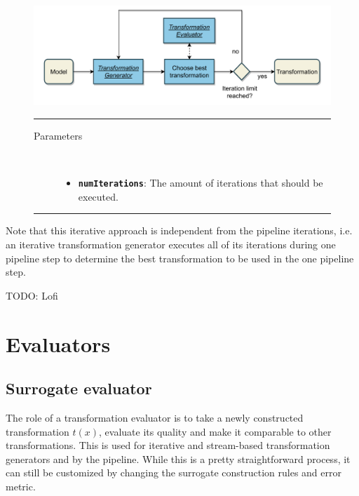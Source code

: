 \documentclass[
  a4paper,  %
  twoside,  %
  bibliography=totoc,
  headsepline,
  cleardoublepage=empty,
  parskip=half,
  draft=false
]{scrbook}
\newcommand{\delimit}{{\color{charcoal}\noindent\rule{\textwidth}{1pt}}}
\begin{document}
\begin{mdframed}[style=style,frametitle={Transformation generator (iterative)}]
\begin{figure}[H]
	\includegraphics[width=\textwidth]{graphics/TransformationGen_Iterative.pdf}

\delimit

\begin{description}
\item[Parameters] {~ \begin{itemize}[\null]
\item \texttt{\textbf{numIterations}}: The amount of iterations that should be executed.
\end{itemize}}
\end{description}

\delimit
{}
\label{fig:itg}
\end{figure}
\end{mdframed}


Note that this iterative approach is independent from the pipeline iterations, i.e. an iterative transformation generator executes all of its iterations during one pipeline step to determine the best transformation to be used in the one pipeline step.

TODO: Lofi

\newpage
\section {Evaluators}

\subsection {Surrogate evaluator}
\label{sec:se}

The role of a transformation evaluator is to take a newly constructed transformation $t(x)$, evaluate its quality and make it comparable to other transformations.
This is used for iterative and stream-based transformation generators and by the pipeline.
While this is a pretty straightforward process, it can still be customized by changing the surrogate construction rules and error metric.
\end{document}
